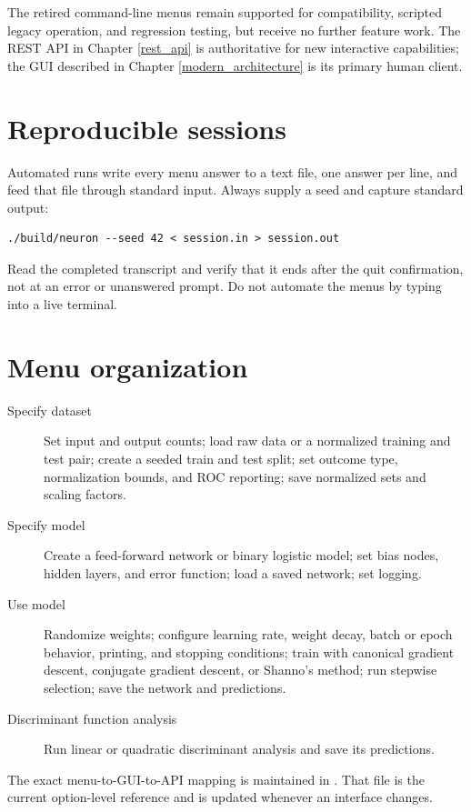The retired command-line menus remain supported for compatibility, scripted
legacy operation, and regression testing, but receive no further feature work.
The REST API in Chapter \ref{rest_api} is authoritative for new interactive
capabilities; the GUI described in Chapter \ref{modern_architecture} is its
primary human client.

\section{Reproducible sessions}

Automated runs write every menu answer to a text file, one answer per
line, and feed that file through standard input.  Always supply a seed
and capture standard output:

\begin{verbatim}
./build/neuron --seed 42 < session.in > session.out
\end{verbatim}

Read the completed transcript and verify that it ends after the quit
confirmation, not at an error or unanswered prompt.  Do not automate
the menus by typing into a live terminal.

\section{Menu organization}

\begin{description}
\item[Specify dataset] Set input and output counts; load raw data or a
normalized training and test pair; create a seeded train and test
split; set outcome type, normalization bounds, and ROC reporting; save
normalized sets and scaling factors.
\item[Specify model] Create a feed-forward network or binary logistic
model; set bias nodes, hidden layers, and error function; load a saved
network; set logging.
\item[Use model] Randomize weights; configure learning rate, weight
decay, batch or epoch behavior, printing, and stopping conditions;
train with canonical gradient descent, conjugate gradient descent, or
Shanno's method; run stepwise selection; save the network and
predictions.
\item[Discriminant function analysis] Run linear or quadratic
discriminant analysis and save its predictions.
\end{description}

The exact menu-to-GUI-to-API mapping is maintained in
.  That file is the current
option-level reference and is updated whenever an interface changes.

